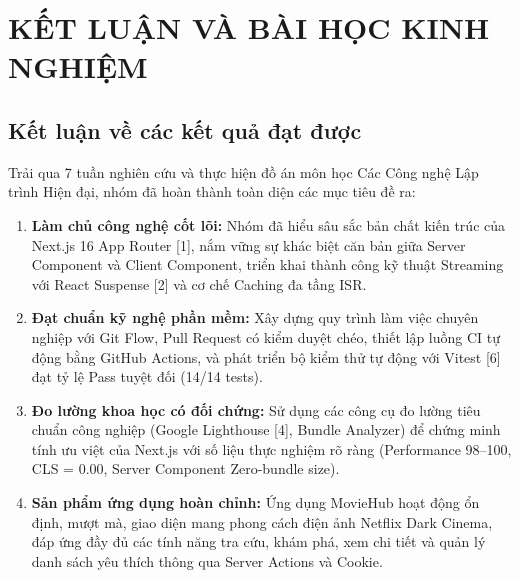 \documentclass[13pt,a4paper]{extarticle}
\begin{document}
\newpage
\section{KẾT LUẬN VÀ BÀI HỌC KINH NGHIỆM}

\subsection{Kết luận về các kết quả đạt được}
Trải qua 7 tuần nghiên cứu và thực hiện đồ án môn học Các Công nghệ Lập trình Hiện đại, nhóm đã hoàn thành toàn diện các mục tiêu đề ra:
\begin{enumerate}[noitemsep]
    \item \textbf{Làm chủ công nghệ cốt lõi:} Nhóm đã hiểu sâu sắc bản chất kiến trúc của Next.js 16 App Router [1], nắm vững sự khác biệt căn bản giữa Server Component và Client Component, triển khai thành công kỹ thuật Streaming với React Suspense [2] và cơ chế Caching đa tầng ISR.
    \item \textbf{Đạt chuẩn kỹ nghệ phần mềm:} Xây dựng quy trình làm việc chuyên nghiệp với Git Flow, Pull Request có kiểm duyệt chéo, thiết lập luồng CI tự động bằng GitHub Actions, và phát triển bộ kiểm thử tự động với Vitest [6] đạt tỷ lệ Pass tuyệt đối (14/14 tests).
    \item \textbf{Đo lường khoa học có đối chứng:} Sử dụng các công cụ đo lường tiêu chuẩn công nghiệp (Google Lighthouse [4], Bundle Analyzer) để chứng minh tính ưu việt của Next.js với số liệu thực nghiệm rõ ràng (Performance 98--100, CLS = 0.00, Server Component Zero-bundle size).
    \item \textbf{Sản phẩm ứng dụng hoàn chỉnh:} Ứng dụng MovieHub hoạt động ổn định, mượt mà, giao diện mang phong cách điện ảnh Netflix Dark Cinema, đáp ứng đầy đủ các tính năng tra cứu, khám phá, xem chi tiết và quản lý danh sách yêu thích thông qua Server Actions và Cookie.
\end{enumerate}
\end{document}
